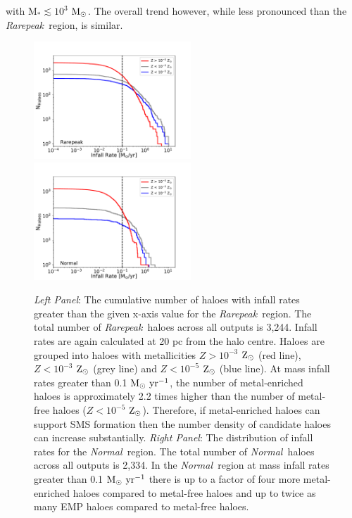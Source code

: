 \documentclass[twocolumn,iop,revtex4]{openjournal}
\newcommand{\msolarc} {$\rm{M_{\odot}}$}
\newcommand{\msolaryr} {$\rm{M_{\odot}~yr^{-1}}~$}
\newcommand{\msolaryrc} {$\rm{M_{\odot}~yr^{-1}}$}
\newcommand{\zsolar} {$\rm{Z_{\odot}}~$}
\newcommand{\zsolarc} {$\rm{Z_{\odot}}$}
\newcommand{\rarepeak} {\textit{Rarepeak~}}
\newcommand{\normal} {\textit{Normal~}}
\begin{document}
with M$_{*} \lesssim 10^3$ \msolarc. The overall trend however, while less pronounced than the \rarepeak region, is
similar. \\
\begin{figure}
\centering
\begin{minipage}{175mm}      \begin{center} 
\centerline{
\includegraphics[width=0.525\textwidth]{FIGURES/Rarepeak_NHaloes.pdf}
\includegraphics[width=0.525\textwidth]{FIGURES/Normal_NHaloes.pdf}}
\caption{\textit{Left Panel}: The cumulative number of haloes with infall rates greater than the given
  x-axis value for the \rarepeak region.  The total number of \rarepeak haloes across all outputs
  is 3,244. Infall rates are again calculated at 20 pc from the halo centre.
  Haloes are grouped into haloes with metallicities $Z> 10^{-3}$ \zsolar (red line),
  $Z< 10^{-3}$ \zsolar (grey line) and  $Z< 10^{-5}$ \zsolar (blue line). At mass infall
  rates greater than 0.1 \msolaryrc, the number of metal-enriched haloes is approximately 2.2 times
  higher than the number of 
  metal-free haloes ($Z< 10^{-5}$ \zsolarc). Therefore, if metal-enriched haloes can support SMS
  formation then the number density of candidate haloes can increase substantially. 
  \textit{Right Panel}: The distribution of
  infall rates for the \normal region. The  total number of \normal haloes across all outputs is 2,334.
  In the \normal region at mass infall
  rates greater than 0.1 \msolaryr there is up to a factor of four more metal-enriched haloes compared to
  metal-free haloes and up to twice as many EMP haloes compared to metal-free haloes. 
 } \label{Fig:Histogram}
\end{center} \end{minipage}

\end{figure}
\end{document}
